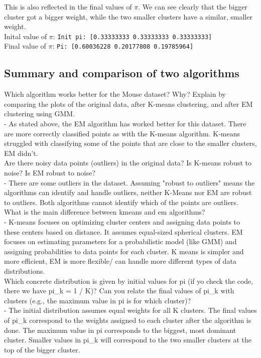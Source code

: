     This is also reflected in the final values of $\pi$.
    We can see clearly that the bigger cluster got a bigger weight, while the two smaller clusters have a similar, smaller weight.\\
    Inital value of $\pi$: \texttt{Init pi: [0.33333333 0.33333333 0.33333333]}\\
    Final value of $\pi$: \texttt{Pi: [0.60036228 0.20177808 0.19785964]}

    \subsection{Summary and comparison of two algorithms}

    Which algorithm works better for the Mouse dataset? Why? Explain by comparing the plots of the original data, after K-means clustering, and after EM clustering using GMM.\\
    - As stated above, the EM algorithm has worked better for this dataset. There are more correctly classified points as with the K-means algorithm. K-means struggled with classifying some of the points that are close to the smaller clusters, EM didn't.\\

    Are there noisy data points (outliers) in  the original data? Is K-means robust to noise? Is EM robust to noise?\\
    - There are some outliers in the dataset. Assuming "robust to outliers" means the algorithms can identify and handle outliers, neither K-Means nor EM are robust to outliers. Both algorithms cannot identify which of the points are outliers.\\

    What is the main difference between kmeans and em algorithms? \\
    - K-means focuses on optimizing cluster centers and assigning data points to these centers based on distance. It assumes equal-sized spherical clusters. EM focuses on estimating parameters for a probabilistic model (like GMM) and assigning probabilities to data points for each cluster. K means is simpler and more efficient, EM is more flexible/ can handle more different types of data distributions. \\

    Which concrete distribution is given by initial values for pi (if yo check the code, there we have pi\_k = 1 / K)? Can you relate the final values of pi\_k with clusters (e.g., the maximum value in pi is for which cluster)? \\
    - The initial distribution assumes equal weights for all K clusters. The final values of pi\_k correspond to the weights assigned to each cluster after the algorithm is done. The maximum value in pi corresponds to the biggest, most dominant cluster. Smaller values in pi\_k will correspond to the two smaller clusters at the top of the bigger cluster.\\

